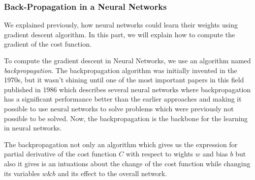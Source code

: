 \subsubsection{Back-Propagation in a Neural Networks}

We explained previously,  how neural networks could learn their weights using gradient descent algorithm. In this part, we will explain how to compute the gradient of the cost function.

To compute the gradient descent in Neural Networks, we use an algorithm named \textit{backpropagation}. The backpropagation algorithm was initially invented in the 1970s, but it wasn't shining until one of the most important papers in this field published in 1986 %
which describes several neural networks where backpropagation has a significant performance better than the earlier approaches and making it possible to use neural networks to solve problems which were previously not possible to be solved. Now, the backpropagation is the backbone for the learning in neural networks.%

The backpropagation not only an algorithm which gives us the expression for partial derivative of the cost function $C$ with respect to wights $w$ and bias $b$ but also it gives is an intuations about the change of the cost function while changing its variables $w \& b$ and its effect to the overall network.

